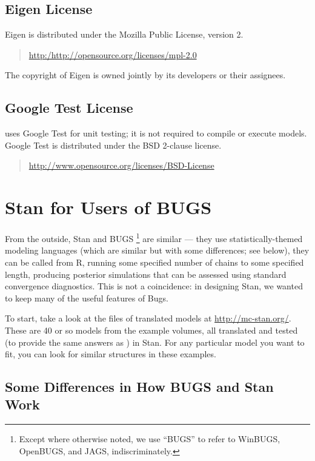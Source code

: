 \section{Eigen License} 
%
Eigen is distributed under the Mozilla Public License,
version 2.
%
\begin{quote}
\url{http:/http://opensource.org/licenses/mpl-2.0}
\end{quote}
%
The copyright of Eigen is owned jointly by its developers or their
assignees. 

\section{Google Test License}

\Stan uses Google Test for unit testing; it is not required to compile
or execute models.  Google Test is distributed under the BSD 2-clause
license.
%
\begin{quote}
\url{http://www.opensource.org/licenses/BSD-License}
\end{quote}


\chapter{Stan for Users of BUGS}\label{stan-for-bugs.appendix}

From the outside, Stan and BUGS%
%
\footnote{Except where otherwise noted, we use ``BUGS'' to refer to
  WinBUGS, OpenBUGS, and JAGS, indiscriminately.}
%
are similar --- they use statistically-themed modeling languages
(which are similar but with some differences; see below), they can be
called from R, running some specified number of chains to some
specified length, producing posterior simulations that can be assessed
using standard convergence diagnostics.  This is not a coincidence:
in designing Stan, we wanted to keep many of the useful features of
Bugs.

To start, take a look at the files of translated \BUGS models at
\url{http://mc-stan.org/}.  These are 40 or so models from the \BUGS
example volumes, all translated and tested (to provide the same
answers as \BUGS) in Stan.  For any particular model you want to fit,
you can look for similar structures in these examples.

\section{Some Differences in How BUGS and Stan Work}

